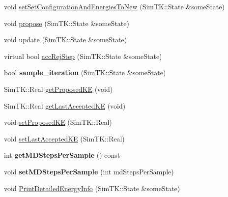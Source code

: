 \begin{DoxyCompactItemize}
\item 
void \hyperlink{classLAHMCSampler_ae7a0d2db9791c6e6947d8273b90f95b8}{set\+Set\+Configuration\+And\+Energies\+To\+New} (Sim\+T\+K\+::\+State \&some\+State)
\item 
void \hyperlink{classLAHMCSampler_aedb4b87feaaa20c036c908c9e9868b41}{propose} (Sim\+T\+K\+::\+State \&some\+State)
\item 
void \hyperlink{classLAHMCSampler_ace1c39b2b136a63d4f00bb5fcd5508c9}{update} (Sim\+T\+K\+::\+State \&some\+State)
\item 
virtual bool \hyperlink{classLAHMCSampler_a0baac57ec1fe8d795a6fea65acdf86ed}{acc\+Rej\+Step} (Sim\+T\+K\+::\+State \&some\+State)
\item 
bool {\bfseries sample\+\_\+iteration} (Sim\+T\+K\+::\+State \&some\+State)\hypertarget{classLAHMCSampler_a0c41a55a68bd21dd21d12c242880495b}{}\label{classLAHMCSampler_a0c41a55a68bd21dd21d12c242880495b}

\item 
Sim\+T\+K\+::\+Real \hyperlink{classLAHMCSampler_a45b90c6c7fb2aa0058190de36049f52e}{get\+Proposed\+KE} (void)
\item 
Sim\+T\+K\+::\+Real \hyperlink{classLAHMCSampler_afa344b5c330421f52c67b7f5f0eee39b}{get\+Last\+Accepted\+KE} (void)
\item 
void \hyperlink{classLAHMCSampler_a784d850d71f9bd99db8b487ed4d8d95e}{set\+Proposed\+KE} (Sim\+T\+K\+::\+Real)
\item 
void \hyperlink{classLAHMCSampler_aa5541db7afb121ab861691c78cf3ed1e}{set\+Last\+Accepted\+KE} (Sim\+T\+K\+::\+Real)
\item 
int {\bfseries get\+M\+D\+Steps\+Per\+Sample} () const \hypertarget{classLAHMCSampler_a21960c0eb41e0f5770889ef746b2d0d3}{}\label{classLAHMCSampler_a21960c0eb41e0f5770889ef746b2d0d3}

\item 
void {\bfseries set\+M\+D\+Steps\+Per\+Sample} (int md\+Steps\+Per\+Sample)\hypertarget{classLAHMCSampler_a23c87fbcec2e0eb55d80fdd46b3b222d}{}\label{classLAHMCSampler_a23c87fbcec2e0eb55d80fdd46b3b222d}

\item 
void \hyperlink{classLAHMCSampler_af62872905cee7ce8de045115a269a670}{Print\+Detailed\+Energy\+Info} (Sim\+T\+K\+::\+State \&some\+State)
\end{DoxyCompactItemize}
